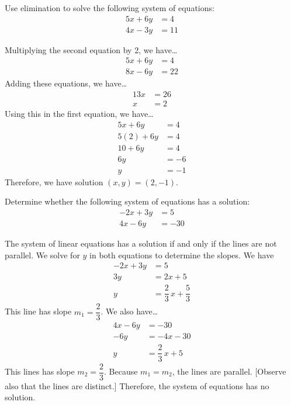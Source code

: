 \documentclass[11pt,letterpaper]{article}
\begin{document}
\newpage



 Use elimination to solve the following system of equations:
	\[
	\begin{aligned}
	5x + 6y&= 4 \\
	4x - 3y&= 11
	\end{aligned}
	\] \pspace

\sol Multiplying the second equation by 2, we have\dots
	\[
	\begin{aligned}
	5x + 6y&= 4 \\
	8x - 6y&= 22
	\end{aligned}
	\] 
Adding these equations, we have\dots
	\[
	\begin{aligned}
	13x&= 26 \\[0.3cm]
	x&= 2
	\end{aligned}
	\] 
Using this in the first equation, we have\dots
	\[
	\begin{aligned}
	5x + 6y&= 4 \\[0.3cm]
	5(2) + 6y&= 4 \\[0.3cm]
	10 + 6y&= 4 \\[0.3cm]
	6y&= -6 \\[0.3cm]
	y&= -1
	\end{aligned}
	\] 
Therefore, we have solution $(x, y)= (2, -1)$. 



\newpage



 Determine whether the following system of equations has a solution:
	\[
	\begin{aligned}
	-2x + 3y&= 5 \\
	4x - 6y&= -30
	\end{aligned}
	\] \pspace

\sol The system of linear equations has a solution if and only if the lines are not parallel. We solve for $y$ in both equations to determine the slopes. We have
	\[
	\begin{aligned}
	-2x + 3y&= 5 \\[0.3cm]
	3y&= 2x + 5 \\[0.3cm]
	y&= \dfrac{2}{3}\,x + \dfrac{5}{3}
	\end{aligned}
	\]
This line has slope $m_1= \dfrac{2}{3}$. We also have\dots
	\[
	\begin{aligned}
	4x - 6y&= -30 \\[0.3cm]
	-6y&= -4x - 30 \\[0.3cm]
	y&= \dfrac{2}{3}\,x + 5
	\end{aligned}
	\]
This lines has slope $m_2= \dfrac{2}{3}$. Because $m_1= m_2$, the lines are parallel. [Observe also that the lines are distinct.] Therefore, the system of equations has no solution.
\end{document}
